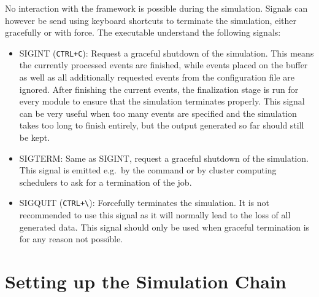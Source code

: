 No interaction with the framework is possible during the simulation. Signals can however be send using keyboard shortcuts to terminate the simulation, either gracefully or with force. The executable understand the following signals:
\begin{itemize}
    \item SIGINT (\texttt{CTRL+C}): Request a graceful shutdown of the simulation. This means the currently processed events are finished, while events placed on the buffer as well as all additionally requested events from the configuration file are ignored. After finishing the current events, the finalization stage is run for every module to ensure that the simulation terminates properly. This signal can be very useful when too many events are specified and the simulation takes too long to finish entirely, but the output generated so far should still be kept.
    \item SIGTERM: Same as SIGINT, request a graceful shutdown of the simulation. This signal is emitted e.g.\ by the  command or by cluster computing schedulers to ask for a termination of the job.
    \item SIGQUIT (\texttt{CTRL+\textbackslash}): Forcefully terminates the simulation. It is not recommended to use this signal as it will normally lead to the loss of all generated data. This signal should only be used when graceful termination is for any reason not possible.
\end{itemize}


\section{Setting up the Simulation Chain}
\label{sec:setting_up_simulation_chain}

